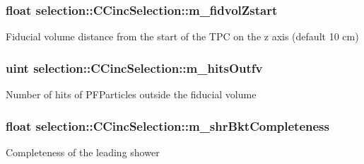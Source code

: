 \subsubsection[{\texorpdfstring{m\+\_\+fidvol\+Zstart}{m_fidvolZstart}}]{\setlength{\rightskip}{0pt plus 5cm}float selection\+::\+C\+Cinc\+Selection\+::m\+\_\+fidvol\+Zstart\hspace{0.3cm}{\ttfamily [private]}}\hypertarget{classselection_1_1CCincSelection_a291cc5986c0861bf1883ec1c41457afd}{}\label{classselection_1_1CCincSelection_a291cc5986c0861bf1883ec1c41457afd}
Fiducial volume distance from the start of the T\+PC on the z axis (default 10 cm) 
\subsubsection[{\texorpdfstring{m\+\_\+hits\+Outfv}{m_hitsOutfv}}]{\setlength{\rightskip}{0pt plus 5cm}uint selection\+::\+C\+Cinc\+Selection\+::m\+\_\+hits\+Outfv\hspace{0.3cm}{\ttfamily [private]}}\hypertarget{classselection_1_1CCincSelection_ac839d87e0a429876df355fee2a561e60}{}\label{classselection_1_1CCincSelection_ac839d87e0a429876df355fee2a561e60}
Number of hits of P\+F\+Particles outside the fiducial volume 
\subsubsection[{\texorpdfstring{m\+\_\+shr\+Bkt\+Completeness}{m_shrBktCompleteness}}]{\setlength{\rightskip}{0pt plus 5cm}float selection\+::\+C\+Cinc\+Selection\+::m\+\_\+shr\+Bkt\+Completeness\hspace{0.3cm}{\ttfamily [private]}}\hypertarget{classselection_1_1CCincSelection_ae50845633aef1725ac8c894101041f54}{}\label{classselection_1_1CCincSelection_ae50845633aef1725ac8c894101041f54}
Completeness of the leading shower 
